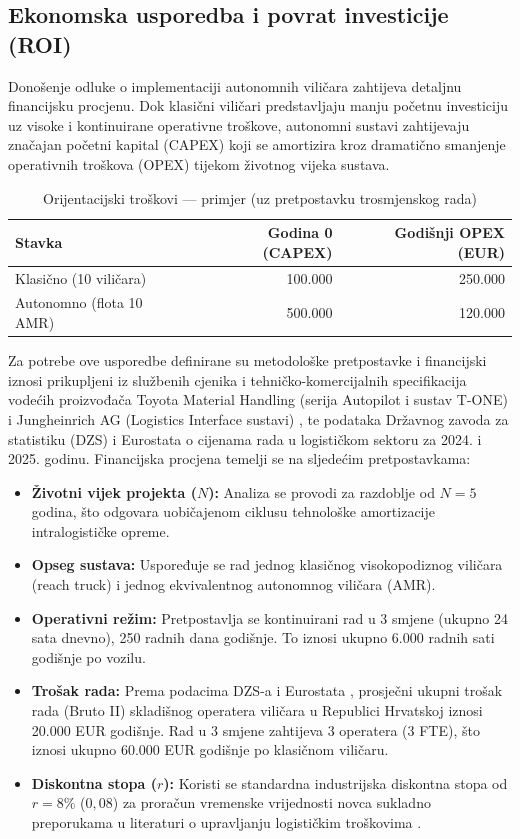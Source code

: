 \subsection{Ekonomska usporedba i povrat investicije (ROI)}
Donošenje odluke o implementaciji autonomnih viličara zahtijeva detaljnu financijsku procjenu. Dok klasični viličari predstavljaju manju početnu investiciju uz visoke i kontinuirane operativne troškove, autonomni sustavi zahtijevaju značajan početni kapital (CAPEX) koji se amortizira kroz dramatično smanjenje operativnih troškova (OPEX) tijekom životnog vijeka sustava.

\begin{table}[h]
\centering
\begin{tabular}{lrr}
\hline
Stavka & Godina 0 (CAPEX) & Godišnji OPEX (EUR) \\
\hline
Klasično (10 viličara) & 100.000 & 250.000 \\
Autonomno (flota 10 AMR) & 500.000 & 120.000 \\
\hline
\end{tabular}
\caption{Orijentacijski troškovi — primjer (uz pretpostavku trosmjenskog rada)}
\label{tab:roi_example}
\end{table}

Za potrebe ove usporedbe definirane su metodološke pretpostavke i financijski iznosi prikupljeni iz službenih cjenika i tehničko-komercijalnih specifikacija vodećih proizvođača Toyota Material Handling (serija Autopilot i sustav T-ONE) \cite{toyota} i Jungheinrich AG (Logistics Interface sustavi) \cite{jungheinrich}, te podataka Državnog zavoda za statistiku (DZS) \cite{dzs} i Eurostata \cite{eurostat} o cijenama rada u logističkom sektoru za 2024. i 2025. godinu.
Financijska procjena temelji se na sljedećim pretpostavkama:
\begin{itemize}
    \item \textbf{Životni vijek projekta ($N$):} Analiza se provodi za razdoblje od $N = 5$ godina, što odgovara uobičajenom ciklusu tehnološke amortizacije intralogističke opreme.
    \item \textbf{Opseg sustava:} Uspoređuje se rad jednog klasičnog visokopodiznog viličara (reach truck) i jednog ekvivalentnog autonomnog viličara (AMR).
    \item \textbf{Operativni režim:} Pretpostavlja se kontinuirani rad u 3 smjene (ukupno 24 sata dnevno), 250 radnih dana godišnje. To iznosi ukupno 6.000 radnih sati godišnje po vozilu.
    \item \textbf{Trošak rada:} Prema podacima DZS-a i Eurostata \cite{dzs, eurostat}, prosječni ukupni trošak rada (Bruto II) skladišnog operatera viličara u Republici Hrvatskoj iznosi 20.000 EUR godišnje. Rad u 3 smjene zahtijeva 3 operatera (3 FTE), što iznosi ukupno 60.000 EUR godišnje po klasičnom viličaru.
    \item \textbf{Diskontna stopa ($r$):} Koristi se standardna industrijska diskontna stopa od $r = 8\%$ ($0,08$) za proračun vremenske vrijednosti novca sukladno preporukama u literaturi o upravljanju logističkim troškovima \cite{bowersox}.
\end{itemize}

